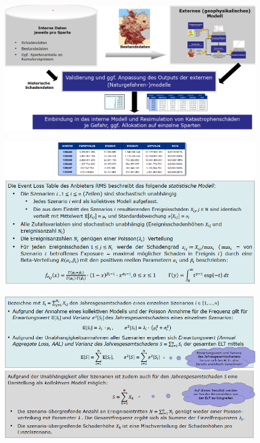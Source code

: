 \documentclass[12pt]{report}
\theoremstyle{dotless}
\theoremstyle{definition}
\begin{document}
\begin{figure}[H]
	\centering
	\includegraphics[width= \textwidth]{Bilder/ExternesModell.png}
\end{figure}

\begin{figure}[H]
	\centering
	\includegraphics[width= \textwidth]{Bilder/Folie70.png}
\end{figure}


\begin{figure}[H]
	\centering
	\includegraphics[width= \textwidth]{Bilder/Folie71.png}
\end{figure}
\end{document}
